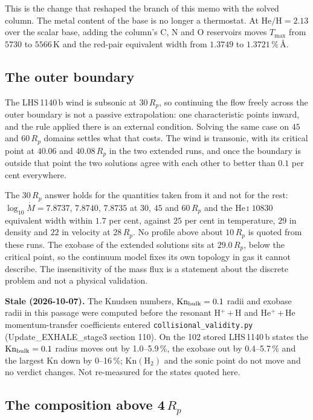 \documentclass[english,a4paper]{my_memo}
\begin{document}
This is the change that reshaped the branch of this memo with the solved
column. The metal content of the base is no longer a thermostat. At
$\mathrm{He/H} = 2.13$ over the scalar base, adding the column's C, N and O
reservoirs moves $T_{\max}$ from $5730$ to $5566$\,K and the red-pair
equivalent width from $1.3749$ to $1.3721$\,\%\,\AA{}.

\subsection{The outer boundary}

The LHS\,1140\,b wind is subsonic at $30\,R_p$, so continuing the flow freely
across the outer boundary is not a passive extrapolation: one characteristic
points inward, and the rule applied there is an external condition. Solving
the same case on $45$ and $60\,R_p$ domains settles what that costs. The wind
is transonic, with its critical point at $40.06$ and $40.08\,R_p$ in the two
extended runs, and once the boundary is outside that point the two solutions
agree with each other to better than $0.1$ per cent everywhere.

The $30\,R_p$ answer holds for the quantities taken from it and not for the
rest: $\log_{10}\dot M = 7.8737$, $7.8740$, $7.8735$ at $30$, $45$ and
$60\,R_p$ and the He\,\textsc{i} $10830$ equivalent width within $1.7$ per
cent, against $25$ per cent in temperature, $29$ in density and $22$ in
velocity at $28\,R_p$. No profile above about $10\,R_p$ is quoted from these
runs. The exobase of the extended solutions sits at $29.0\,R_p$, below the
critical point, so the continuum model fixes its own topology in gas it
cannot describe. The insensitivity of the mass flux is a statement about the
discrete problem and not a physical validation.

\noindent\textbf{Stale (2026-10-07).} The Knudsen numbers, $\mathrm{Kn}_{\rm bulk}=0.1$ radii and exobase radii in this passage were computed before the resonant H$^+$\,+\,H and He$^+$\,+\,He momentum-transfer coefficients entered \texttt{collisional\_validity.py} (Update\_EXHALE\_stage3 section 110). On the 102 stored LHS\,1140\,b states the $\mathrm{Kn}_{\rm bulk}=0.1$ radius moves out by 1.0--5.9\,\%, the exobase out by 0.4--5.7\,\% and the largest Kn down by 0--16\,\%; $\mathrm{Kn}(\mathrm{H_2})$ and the sonic point do not move and no verdict changes. Not re-measured for the states quoted here.

\subsection{The composition above 4\,$R_p$}
\label{sec:frozencomp}
\end{document}

